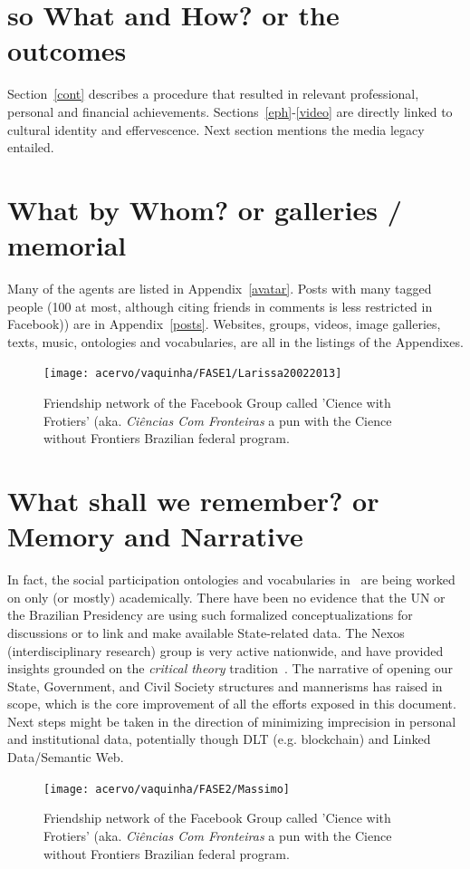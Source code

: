 \documentclass[a4paper]{article}
\begin{document}
\section{so What and How? or the outcomes}
Section~\ref{cont} describes a procedure that resulted in
relevant professional, personal and financial achievements.
Sections~\ref{eph}-\ref{video} are directly linked to cultural identity and effervescence.
Next section mentions the media legacy entailed.

\section{What by Whom? or galleries / memorial}
Many of the agents are listed in Appendix~\ref{avatar}.
Posts with many tagged people (100 at most, although citing friends in comments is less restricted in Facebook)) are in Appendix~\ref{posts}.
Websites, groups, videos, image galleries, texts, music, ontologies and vocabularies, are all in the listings of the Appendixes.

\begin{figure}
  \centering
    \texttt{[image: acervo/vaquinha/FASE1/Larissa20022013]}
  \caption{Friendship network of the Facebook Group called 'Cience with Frotiers' (aka. \emph{Ciências Com Fronteiras} a pun with the Cience without Frontiers Brazilian federal program.}
\end{figure}

\section{What shall we remember? or Memory and Narrative}
In fact, the social participation ontologies and vocabularies in~\cite{thesis}
are being worked on only (or mostly) academically.
There have been no evidence that the UN or the Brazilian Presidency are using
such formalized conceptualizations for discussions or to link and make available State-related data.
The Nexos (interdisciplinary research) group is very active nationwide,
and have provided insights grounded on the \emph{critical theory} tradition~\cite{anPhy2,thesis}.
The narrative of opening our State, Government, and Civil Society structures
and mannerisms has raised in scope, which is the core improvement of all
the efforts exposed in this document.
Next steps might be taken in the direction of minimizing imprecision
in personal and institutional data,
potentially though DLT (e.g. blockchain) and Linked Data/Semantic Web.

\begin{figure}\label{nh}
  \centering
    \texttt{[image: acervo/vaquinha/FASE2/Massimo]}
  \caption{Friendship network of the Facebook Group called 'Cience with Frotiers' (aka. \emph{Ciências Com Fronteiras} a pun with the Cience without Frontiers Brazilian federal program.}
\end{figure}
\end{document}

